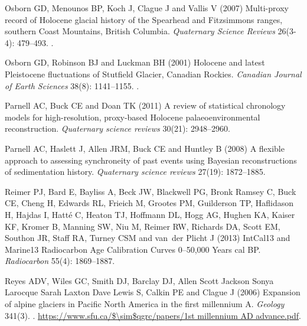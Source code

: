 \documentclass[Royal,times,doublespace,sageh]{sagej}
\begin{document}
\begin{thebibliography}{69}
{
Osborn GD, Menounos BP, Koch J, Clague J and Vallis V (2007) {Multi-proxy
  record of Holocene glacial history of the Spearhead and Fitzsimmons ranges,
  southern Coast Mountains, British Columbia}.
\newblock \emph{Quaternary Science Reviews} 26(3-4): 479--493.
\newblock {}.

Osborn GD, Robinson BJ and Luckman BH (2001) {Holocene and latest Pleistocene
  fluctuations of Stutfield Glacier, Canadian Rockies}.
\newblock \emph{Canadian Journal of Earth Sciences} 38(8): 1141--1155.
\newblock {}.

Parnell AC, Buck CE and Doan TK (2011) {A review of statistical chronology
  models for high-resolution, proxy-based Holocene palaeoenvironmental
  reconstruction}.
\newblock \emph{Quaternary science reviews} 30(21): 2948--2960.

Parnell AC, Haslett J, Allen JRM, Buck CE and Huntley B (2008) {A flexible
  approach to assessing synchroneity of past events using Bayesian
  reconstructions of sedimentation history}.
\newblock \emph{Quaternary science reviews} 27(19): 1872--1885.

Reimer PJ, Bard E, Bayliss A, Beck JW, Blackwell PG, {Bronk Ramsey} C, Buck CE,
  Cheng H, Edwards RL, Frieich M, Grootes PM, Guilderson TP, Haflidason H,
  Hajdas I, Hatt{\'{e}} C, Heaton TJ, Hoffmann DL, Hogg AG, Hughen KA, Kaiser
  KF, Kromer B, Manning SW, Niu M, Reimer RW, Richards DA, Scott EM, Southon
  JR, Staff RA, Turney CSM and van~der Plicht J (2013) {IntCal13 and Marine13
  Radiocarbon Age Calibration Curves 0–50,000 Years cal BP}.
\newblock \emph{Radiocarbon} 55(4): 1869--1887.

Reyes ADV, Wiles GC, Smith DJ, Barclay DJ, {Allen Scott Jackson Sonya Larocque
  Sarah Laxton Dave Lewis} S, Calkin PE and Clague J (2006) {Expansion of
  alpine glaciers in Pacific North America in the first millennium A}.
\newblock \emph{Geology} 341(3).
\newblock {}.
\newblock \urlprefix\url{https://www.sfu.ca/$\sim$qgrc/papers/1st millennium AD
  advance.pdf}.

}
\end{thebibliography}
\end{document}
